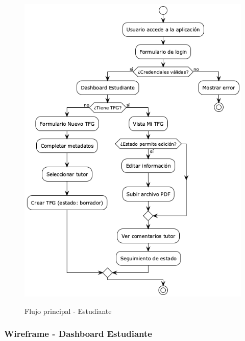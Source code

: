 \documentclass[12pt,a4paper,oneside]{report}
\providecommand{\pandocbounded}[1]{#1}
\begin{document}
\begin{figure}
\centering
\pandocbounded{\includegraphics[keepaspectratio,alt={Flujo principal - Estudiante}]{processed/images/05_diseno_plantuml_4.png}}
\caption{Flujo principal - Estudiante}
\end{figure}

\subsubsection{Wireframe - Dashboard
Estudiante}\label{wireframe---dashboard-estudiante}
\end{document}
